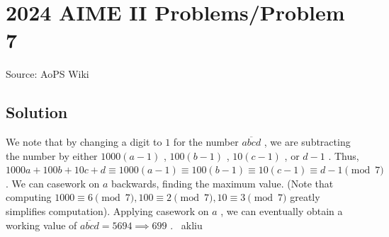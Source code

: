 \documentclass[12pt]{article}
\begin{document}
\section*{{2024 AIME II Problems/Problem 7}}
Source: AoPS Wiki

\subsection*{Solution}
We note that by changing a digit to $1$ for the number $\overline{abcd}$ , we are subtracting the number by either $1000(a-1)$ , $100(b-1)$ , $10(c-1)$ , or $d-1$ . Thus, $1000a + 100b + 10c + d \equiv 1000(a-1) \equiv 100(b-1) \equiv 10(c-1) \equiv d-1 \pmod{7}$ . We can casework on $a$ backwards, finding the maximum value. (Note that computing $1000 \equiv 6 \pmod{7}, 100 \equiv 2 \pmod{7}, 10 \equiv 3 \pmod{7}$ greatly simplifies computation). Applying casework on $a$ , we can eventually obtain a working value of $\overline{abcd} = 5694 \implies \boxed{699}$ . ~akliu
\end{document}
